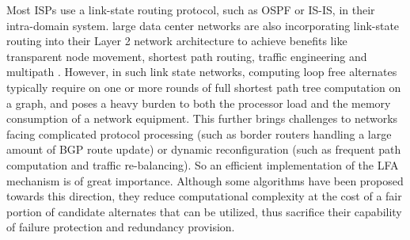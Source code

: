 Most ISPs use a link-state routing protocol, such as OSPF or IS-IS, in their intra-domain system.
large data center networks are also incorporating link-state routing into their Layer 2 network architecture 
to achieve benefits like transparent node movement, shortest path routing, traffic engineering and multipath \cite{perlman2011introduction, TRILL}.
However, in such link state networks, computing loop free alternates typically require on one or more rounds 
of full shortest path tree computation on a graph, and poses a heavy burden to both the processor load and 
the memory consumption of a network equipment. This further brings challenges to networks 
facing complicated protocol processing (such as border routers handling a large amount of BGP route update) 
or dynamic reconfiguration (such as frequent path computation and traffic re-balancing). 
So an efficient implementation of the LFA mechanism is of great importance. Although some algorithms \cite{TBFH, dmpa}
have been proposed towards this direction, they reduce computational complexity at the cost of  
a fair portion of candidate alternates that can be utilized, thus sacrifice their capability of failure protection and 
redundancy provision. 

